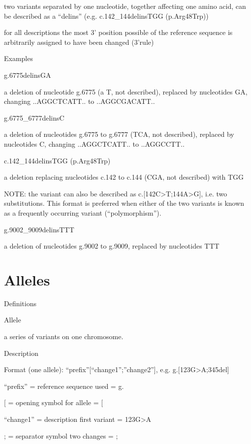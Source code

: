 \documentclass{book}
\begin{document}
	two variants separated by one nucleotide, together affecting one amino acid, can be described as a “delins” (e.g. c.142\_144delinsTGG (p.Arg48Trp))

	for all descriptions the most 3’ position possible of the reference sequence is arbitrarily assigned to have been changed (3’rule)

	

	

	Examples

	g.6775delinsGA

	a deletion of nucleotide g.6775 (a T, not described), replaced by nucleotides GA, changing ..AGGCTCATT.. to ..AGGCGACATT..

	g.6775\_6777delinsC

	a deletion of nucleotides g.6775 to g.6777 (TCA, not described), replaced by nucleotides C, changing ..AGGCTCATT.. to ..AGGCCTT..

	c.142\_144delinsTGG (p.Arg48Trp)

	a deletion replacing nucleotides c.142 to c.144 (CGA, not described) with TGG

	NOTE: the variant can also be described as c.[142C>T;144A>G], i.e. two substitutions. This format is preferred when either of the two variants is known as a frequently occurring variant (“polymorphism”).

	g.9002\_9009delinsTTT

	a deletion of nucleotides g.9002 to g.9009, replaced by nucleotides TTT

	

	\section{Alleles}

	Definitions

	Allele

	a series of variants on one chromosome.

	

	

	Description

	Format (one allele): “prefix”[“change1”;”change2”], e.g. g.[123G>A;345del]

	“prefix” = reference sequence used = g.

	[ = opening symbol for allele = [

	“change1” = description first variant = 123G>A

	; = separator symbol two changes = ;
\end{document}
